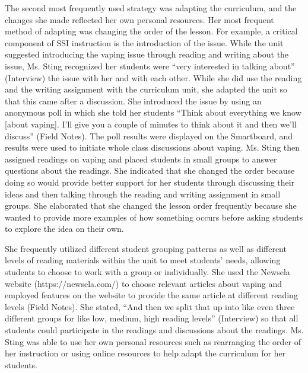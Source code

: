 \documentclass[11.5pt]{sig-alternate}
\begin{document}
\begin{large}
The second most frequently used strategy was adapting the curriculum, and the changes she made reflected her own personal resources. Her most frequent method of adapting was changing the order of the lesson. For example, a critical component of SSI instruction is the introduction of the issue. While the unit suggested introducing the vaping issue through reading and writing about the issue, Ms. Sting recognized her students were “very interested in talking about” (Interview) the issue with her and with each other. While she did use the reading and the writing assignment with the curriculum unit, she adapted the unit so that this came after a discussion. She introduced the issue by using an anonymous poll in which she told her students “Think about everything we know [about vaping]. I’ll give you a couple of minutes to think about it and then we’ll discuss” (Field Notes). The poll results were displayed on the Smartboard, and results were used to initiate whole class discussions about vaping. Ms. Sting then assigned readings on vaping and placed students in small groups to answer questions about the readings. She indicated that she changed the order because doing so would provide better support for her students through discussing their ideas and then talking through the reading and writing assignment in small groups. She elaborated that she changed the lesson order frequently because she wanted to provide more examples of how something occurs before asking students to explore the idea on their own.

She frequently utilized different student grouping patterns as well as different levels of reading materials within the unit to meet students’ needs, allowing students to choose to work with a group or individually. She used the Newsela website (https://newsela.com/) to choose relevant articles about vaping and employed features on the website to provide the same article at different reading levels (Field Notes). She stated, “And then we split that up into like even three different groups for like low, medium, high reading levels” (Interview) so that all students could participate in the readings and discussions about the readings. Ms. Sting was able to use her own personal resources such as rearranging the order of her instruction or using online resources to help adapt the curriculum for her students.


\end{large}
\end{document}
